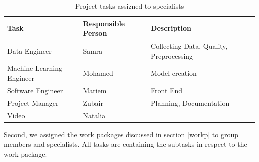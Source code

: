 \documentclass[lang=english,inputenc=utf8,fontsize=10pt]{ldvarticle}
\begin{document}
\begin{table}[ht]
\begin{tabular}{l|l|l}
Task                      & Responsible Person  & Description                             \\ \hline
Data Engineer             & Samra               & Collecting Data, Quality, Preprocessing \\
Machine Learning Engineer & Mohamed             & Model creation                          \\
Software Engineer         & Mariem              & Front End                               \\
Project Manager           & Zubair              & Planning, Documentation                 \\
Video                     & Natalia             &                                        
\end{tabular}
\caption{Project tasks assigned to specialists}
\label{tab:special}
\end{table}

Second, we assigned the work packages discussed in section \ref{workp} to group members and specialists. All tasks are containing the subtasks in respect to the work package.
\end{document}

